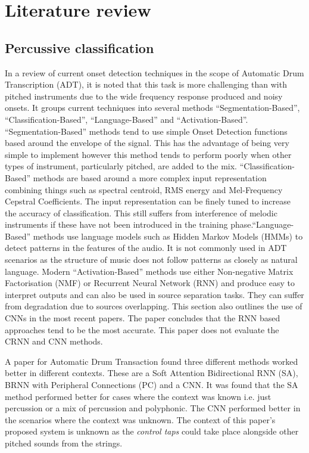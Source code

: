 \documentclass[conference]{IEEEtran}
\begin{document}
\section{Literature review}

\subsection{Percussive classification}
In a review of current onset detection techniques in the scope of Automatic Drum Transcription (ADT), it is noted that this task is more challenging than with pitched instruments
due to the wide frequency response produced and noisy onsets. It groups current techniques into several methods ``Segmentation-Based'', ``Classification-Based'', ``Language-Based''
 and ``Activation-Based''. ``Segmentation-Based'' methods tend to use simple Onset Detection functions based around the envelope of the signal. This has the advantage of being very simple
to implement however this method tends to perform poorly when other types of instrument, particularly pitched, are added to the mix. ``Classification-Based'' methods are based around
a more complex input representation combining things such as spectral centroid, RMS energy and Mel-Frequency Cepstral Coefficients. The input representation can be finely tuned to increase
the accuracy of classification. This still suffers from interference of melodic instruments if these have not been introduced in the training phase.``Language-Based'' methods use language
models such as Hidden Markov Models (HMMs) to detect patterns in the features of the audio. It is not commonly used in ADT scenarios as the structure of music does not follow patterns
as closely as natural language. Modern ``Activation-Based'' methods use either Non-negative Matrix Factorisation (NMF) or Recurrent Neural Network (RNN) and produce easy to interpret
outputs and can also be used in source separation tasks. They can suffer from degradation due to sources overlapping. This section also outlines the use of CNNs in the most recent papers. 
The paper concludes that the RNN based approaches tend to be the most accurate. This paper does not evaluate the CRNN and CNN methods. 

A paper for Automatic Drum Transaction found three different methods worked better in different contexts. These are a Soft Attention Bidirectional RNN (SA), BRNN with Peripheral Connections (PC) and a CNN. 
It was found that the SA method performed better for cases where the context was known i.e. just percussion or a mix of percussion and polyphonic. The CNN performed better in the 
scenarios where the context was unknown. The context of this paper's proposed system is unknown as the \emph{control taps} could take place alongside other pitched sounds from the strings.
\end{document}
